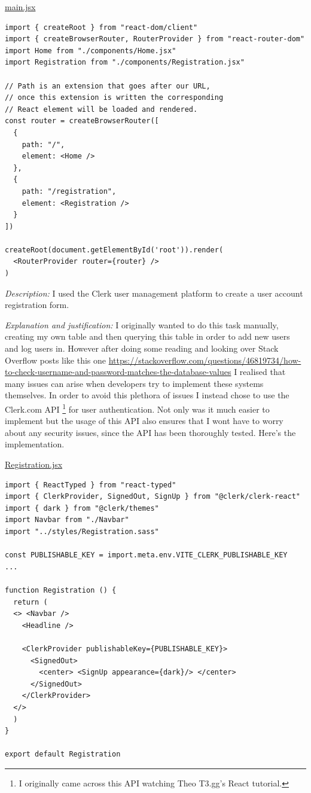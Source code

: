 \underline{main.jsx} \\ \vspace{0.2cm}

\begin{verbatim}
import { createRoot } from "react-dom/client"
import { createBrowserRouter, RouterProvider } from "react-router-dom"
import Home from "./components/Home.jsx"
import Registration from "./components/Registration.jsx"

// Path is an extension that goes after our URL,
// once this extension is written the corresponding
// React element will be loaded and rendered.
const router = createBrowserRouter([
  {
    path: "/",
    element: <Home />
  },
  {
    path: "/registration",
    element: <Registration />
  }
])

createRoot(document.getElementById('root')).render(
  <RouterProvider router={router} />
)
\end{verbatim}

\textit{Description:} I used the Clerk user management
platform to create a user account registration form.\\
\vspace{0.2cm}

\textit{Explanation and justification:} I originally wanted to
do this task manually, creating my own table and then querying
this table in order to add new users and log users in. However
after doing some reading and looking over Stack Overflow posts
like this one \url{https://stackoverflow.com/questions/46819734/how-to-check-username-and-password-matches-the-database-values}
I realised that many issues can arise when developers try to
implement these systems themselves. In order to avoid this
plethora of issues I instead chose to use the Clerk.com API
\footnote{I originally came across this API watching Theo T3.gg's
React tutorial.}
for user authentication. Not only was it much easier to implement
but the usage of this API also ensures that I wont have to worry
about any security issues, since the API has been thoroughly
tested. Here's the implementation. \\ \vspace{0.2cm}

\underline{Registration.jsx}
\begin{verbatim}
import { ReactTyped } from "react-typed"
import { ClerkProvider, SignedOut, SignUp } from "@clerk/clerk-react"
import { dark } from "@clerk/themes"
import Navbar from "./Navbar"
import "../styles/Registration.sass"

const PUBLISHABLE_KEY = import.meta.env.VITE_CLERK_PUBLISHABLE_KEY
...

function Registration () {
  return (
  <> <Navbar />
    <Headline />

    <ClerkProvider publishableKey={PUBLISHABLE_KEY}>
      <SignedOut>
        <center> <SignUp appearance={dark}/> </center>
      </SignedOut>
    </ClerkProvider>
  </>
  )
}

export default Registration
\end{verbatim}

